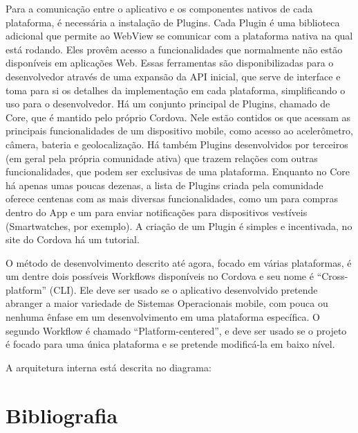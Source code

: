 \documentclass[a4paper,12pt]{article}
\begin{document}
Para a comunicação entre o aplicativo e os componentes nativos de cada plataforma, é necessária a instalação de Plugins.
Cada Plugin é uma biblioteca adicional que permite ao WebView se comunicar com a plataforma nativa na qual está rodando. Eles provêm acesso a funcionalidades que normalmente não estão disponíveis em aplicações Web. Essas ferramentas são disponibilizadas para o desenvolvedor através de uma expansão da API inicial, que serve de interface e toma para si os detalhes da implementação em cada plataforma, simplificando o uso para o desenvolvedor.
Há um conjunto principal de Plugins, chamado de Core, que é mantido pelo próprio Cordova. Nele estão contidos os que acessam as principais funcionalidades de um dispositivo mobile, como acesso ao acelerômetro, câmera, bateria e geolocalização.
Há também Plugins desenvolvidos por terceiros (em geral pela própria comunidade ativa) que trazem relações com outras funcionalidades, que podem ser exclusivas de uma plataforma. Enquanto no Core há apenas umas poucas dezenas, a lista de Plugins criada pela comunidade oferece centenas com as mais diversas funcionalidades, como um para compras dentro do App e um para enviar notificações para dispositivos vestíveis (Smartwatches, por exemplo). A criação de um Plugin é simples e incentivada, no site do Cordova há um tutorial.


O método de desenvolvimento descrito até agora, focado em várias plataformas, é um dentre dois possíveis Workflows disponíveis no Cordova e seu nome é “Cross-platform” (CLI). Ele deve ser usado se o aplicativo desenvolvido pretende abranger a maior variedade de Sistemas Operacionais mobile, com pouca ou nenhuma ênfase em um desenvolvimento em uma plataforma específica.
O segundo Workflow é chamado “Platform-centered”, e deve ser usado se o projeto é focado para uma única plataforma e se pretende modificá-la em baixo nível.


A arquitetura interna está descrita no diagrama:






\section{Bibliografia}












 \singlespacing   %

\end{document}
